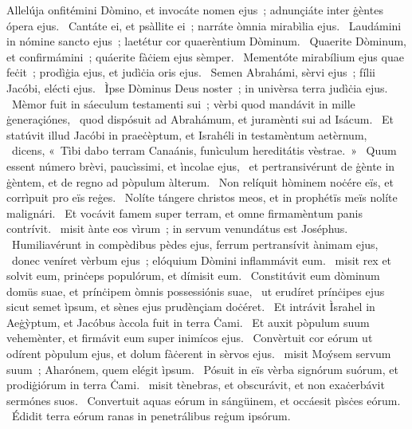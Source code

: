 { Allelúja}
{%
onfitémini Dòmino, et invocáte nomen ejus~; adnunçiáte inter ġèntes ópera ejus. 
~Cantáte ei, et psàllite ei~; narráte òmnia mirabìlia ejus. 
~Laudámini in nómine sancto ejus~; laetétur cor quaerèntium Dòminum. 
~Quaerite Dòminum, et confirmámini~; quáerite fàċiem ejus sèmper. 
~Mementóte mirabílium ejus quae feċit~; prodìġia ejus, et judìċia oris ejus. 
~Semen Abrahámi, sèrvi ejus~; fílii Jacóbi, elécti ejus. 
~Ìpse Dòminus Deus noster~; in univèrsa terra judìċia ejus. 
~Mèmor fuit in sáeculum testamenti sui~; vèrbi quod mandávit in mille ġeneraçiónes, 
~quod dispósuit ad Abrahámum, et juramènti sui ad Isácum. 
~Et statúvit illud Jacóbi in praeċèptum, et Israhéli in testamèntum aetèrnum, 
~dicens, «~Tìbi dabo terram Canaánis, funìculum hereditátis vèstrae.~» 
~Quum essent número brèvi, paucìssimi, et ìncolae ejus, 
~et pertransivérunt de ġènte in ġèntem, et de regno ad pòpulum àlterum. 
~Non relíquit hòminem noċére eïs, et corrìpuit pro eïs reġes. 
~Nolíte tángere christos meos, et in prophétïs meïs nolíte malignári. 
~Et vocávit famem super terram, et omne firmamèntum panis contrívit. 
~misit ànte eos vìrum~; in servum venundátus est Joséphus. 
~Humiliavérunt in compèdibus pèdes ejus, ferrum pertransívit ànimam ejus, 
~donec veníret vèrbum ejus~; elóquium Dòmini inflammávit eum. 
~misit rex et solvit eum, prinċeps populórum, et dímisit eum. 
~Constitúvit eum dòminum domüs suae, et prínċipem òmnis possessiónis suae, 
~ut erudíret prínċipes ejus sicut semet ìpsum, et sènes ejus prudènçiam doċéret. 
~Et intrávit Ìsrahel in Aeġỳptum, et Jacóbus àccola fuit in terra Ċami. 
~Et auxit pòpulum suum vehemènter, et firmávit eum super inimícos ejus. 
~Convèrtuit cor eórum ut odírent pòpulum ejus, et dolum fàċerent in sèrvos ejus. 
~misit Moýsem servum suum~; Aharónem, quem elégit ìpsum. 
~Pósuit in eïs vèrba signórum suórum, et prodiġiórum in terra Ċami. 
~misit tènebras, et obscurávit, et non exaċerbávit sermónes suos. 
~Convertuit aquas eórum in sángüinem, et occáesit pìsċes eórum. 
~Édidit terra eórum ranas in penetrálibus reġum ipsórum. 
}
